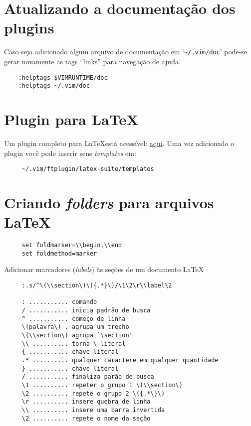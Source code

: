 \section{Atualizando a documentação dos plugins}\label{sec:Atualizando a documentação dos plugins}
Caso seja adicionado algum arquivo de documentação em `\verb+~/.vim/doc+' pode-se 
gerar novamente as tags ``links'' para navegação de ajuda.

\begin{verbatim}
    :helptags $VIMRUNTIME/doc
    :helptags ~/.vim/doc
\end{verbatim}


\section{Plugin para \LaTeX}
\label{Plugin para LaTeX}

Um plugin completo para \LaTeX está acessível:
\href{http://vim-latex.sourceforge.net/}{aqui}. Uma vez adicionado o plugin você pode
inserir seus {\em templates} em:

\begin{verbatim}
     ~/.vim/ftplugin/latex-suite/templates
\end{verbatim}


\section{Criando {\em folders} para arquivos \LaTeX}
\label{Criando folders para arquivos LaTeX}

\begin{verbatim}
     set foldmarker=\\begin,\\end
     set foldmethod=marker
\end{verbatim}

Adicionar marcadores ({\em labels}) às seções de um documento \LaTeX
\begin{verbatim}
     :.s/^\(\\section\)\({.*}\)/\1\2\r\\label\2
     
     : ........... comando
     / ........... inicia padrão de busca
     ^ ........... começo de linha
     \(palavra\) . agrupa um trecho
     \(\\section\) agrupa `\section'
     \\ .......... torna \ literal
     { ........... chave literal
     .* .......... qualquer caractere em qualquer quantidade
     } ........... chave literal
     / ........... finaliza parão de busca
     \1 .......... repeter o grupo 1 \(\\section\) 
     \2 .......... repete o grupo 2 \({.*\}\)
     \r .......... insere quebra de linha
     \\ .......... insere uma barra invertida
     \2 .......... repete o nome da seção
\end{verbatim}

